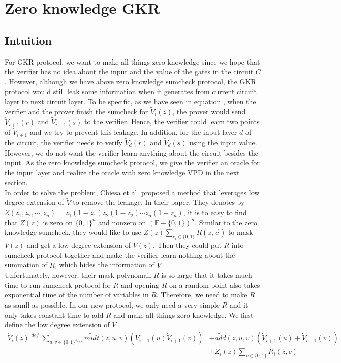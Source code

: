 \section{Zero knowledge GKR}

\subsection{Intuition}
For GKR protocol, we want to make all things zero knowledge since we hope that the verifier has no idea about the input and the value of the gates in the circuit $C$. However, although we have above zero knowledge sumcheck protocol, the GKR protocol would still leak some information when it generates from current circuit layer to next circuit layer. To be specific, as we have seen in equation , when the verifier and the prover finish the sumcheck for $\tilde{V}_i(z)$, the prover would send $\tilde{V}_{i+1}(r)$ and $\tilde{V}_{i+1}(s)$ to the verifier. Hence, the verifier could learn two points of $\tilde{V}_{i+1}$ and we try to prevent this leakage. In addition, for the input layer $d$ of the circuit, the verifier needs to verify $\tilde{V}_d(r)$ and $\tilde{V}_d(s)$ using the input value. However, we do not want the verifier learn anything about the circuit besides the input. As the zero knowledge sumcheck protocol, we give the verifier an oracle for the input layer and realize the oracle with zero knowledge VPD in the next section. \\

In order to solve the problem, Chiesa et al.\cite{zksumcheck} proposed a method that leverages low degree extension of $\tilde{V}$ to remove the leakage. In their paper, They denotes by $Z(z_1, z_2, \cdots, z_n) = z_1(1-z_1)z_2(1-z_2) \cdots z_n(1-z_n)$, it is to easy to find that $Z(z)$ is zero on $\{0, 1\}^n$ and nonzero on $(\mathbb{F} - \{0, 1\})^n$. Similar to the zero knowledge sumcheck, they would like to use $Z(z) \sum\limits_{c_i \in \{0, 1\}}R(z, \vec{c})$ to mask $V(z)$ and get a low degree extension of $V(z)$. Then they could put $R$ into sumcheck protocol together and make the verifier learn nothing about the summation of $R$, which hides the information of $\tilde{V}$.\\

Unfortunately, however, their mask polynomail $R$ is so large that it takes much time to run sumcheck protocol for $R$ and opening $R$ on a random point also takes exponential time of the number of variables in $R$. Therefore, we need to make $R$ as samll as possible. In our new protocol, we only need a very simple $R$ and it only takes constant time to add $R$ and make all things zero knowledge. We first define the low degree extension of $\tilde{V}$.\\ 
\begin{align*}
\dot{V}_{i}(z) \overset{def}{=}\sum_{u, v\in \{0,1\}^{s_{i+1}}}\tilde{mult}(z, u, v)(\dot{V}_{i+1}(u)\dot{V}_{i+1}(v))&+\tilde{add}(z,u,v)(\dot{V}_{i+1}(u)+\dot{V}_{i+1}(v))\\
 &+ Z_i(z)\sum\limits_{c \in \{0, 1\}}R_i(z, c)\\
\end{align*}

